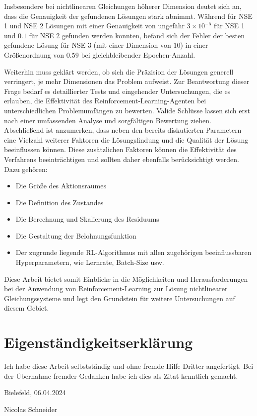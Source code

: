 \documentclass{article}
\theoremstyle{newline}
\begin{document}
\begin{onehalfspace}
Insbesondere bei nichtlinearen Gleichungen höherer Dimension deutet sich an, dass die Genauigkeit der gefundenen Lösungen stark abnimmt. Während für NSE 1 und NSE 2 Lösungen mit einer Genauigkeit von ungefähr $3 \times 10^{-5}$ für NSE 1 und $0.1$ für NSE 2 gefunden werden konnten, befand sich der Fehler der besten gefundene Lösung für NSE 3 (mit einer Dimension von  $10$) in einer Größenordnung von $0.59$ bei gleichbleibender Epochen-Anzahl.

Weiterhin muss geklärt werden, ob sich die Präzision der Lösungen generell verringert, je mehr Dimensionen das Problem aufweist. Zur Beantwortung dieser Frage bedarf es detaillierter Tests und eingehender Untersuchungen, die es erlauben, die Effektivität des Reinforcement-Learning-Agenten bei unterschiedlichen Problemumfängen zu bewerten. Valide Schlüsse lassen sich erst nach einer umfassenden Analyse und sorgfältigen Bewertung ziehen.
\\

Abschließend ist anzumerken, dass neben den bereits diskutierten Parametern eine Vielzahl weiterer Faktoren die Lösungsfindung und die Qualität der Lösung beeinflussen können. Diese zusätzlichen Faktoren können die Effektivität des Verfahrens beeinträchtigen und sollten daher ebenfalls berücksichtigt werden. Dazu gehören:

\begin{itemize}
	\item Die Größe des Aktionsraumes
	\item Die Definition des Zustandes
	\item Die Berechnung und Skalierung des Residuums
	\item Die Gestaltung der Belohnungsfunktion
	\item Der zugrunde liegende RL-Algorithmus mit allen zugehörigen beeinflussbaren Hyperparametern, wie Lernrate, Batch-Size usw.
\end{itemize}

Diese Arbeit bietet somit Einblicke in die Möglichkeiten und Herausforderungen bei der Anwendung von Reinforcement-Learning zur Lösung nichtlinearer Gleichungssysteme und legt den Grundstein für weitere Untersuchungen auf diesem Gebiet. 


\newpage

\clearpage %


\printbibliography

\newpage

\section{Eigenständigkeitserklärung}

Ich habe diese Arbeit selbstständig und ohne fremde Hilfe Dritter angefertigt. Bei der Übernahme fremder Gedanken habe ich dies als Zitat kenntlich gemacht. 

Bielefeld, 06.04.2024

Nicolas Schneider

\end{onehalfspace}
\end{document}
